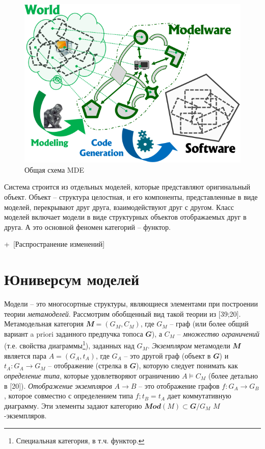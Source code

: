 \documentclass[11pt,draft]{ltxdoc}
\newcommand{\aaa}[2][acolor]{\noindent\textcolor{eclr}%
{+\ [}\textcolor{#1}{#2}\textcolor{eclr}{]}}
\begin{document}
\begin{figure}[htbp]
  \centering
  \includegraphics[width=0.5\linewidth]{mde-general}
  \caption{Общая схема MDE}
  \label{fig:mde-gen-schema}
\end{figure}

Система строится из отдельных моделей, которые представляют оригинальный объект.
Объект -- структура целостная, и его компоненты, представленные в виде моделей,
перекрывают друг друга, взаимодействуют друг с другом. Класс моделей включает
модели в виде структурных объектов отображаемых друг в друга. А это основной
феномен категорий -- функтор.

\aaa{Распространение изменений}

\section{Юниверсум моделей}
\label{sec:mmodcat}

Модели -- это многосортные структуры, являющиеся элементами при построении теории
\emph{метамоделей}.  Рассмотрим обобщенный вид такой теории из [39;20].
Метамодельная категория $\mathbfit{M}=(G_M,C_M)$, где $G_M$ -- граф (или более
общий вариант a priori заданного предпучка топоса $\mathbfit{G}$), а
$C_M$ -- \emph{множество ограничений} (т.е. свойства диаграммы\footnote{Специальная
  категория, в т.ч. функтор.}), заданных над $G_M$.  \emph{Экземпляром} метамодели
$\mathbfit{M}$ является пара $A = (G_A, t_A)$, где $G_A$ -- это другой граф
(объект в $\mathbfit{G}$) и $t_A: G_A \to G_M$ -- отображение (стрелка в
$\mathbfit{G}$), которую следует понимать как \emph{определение типа}, которые
удовлетворяют ограничению $A \models C_M$ (более детально в [20]).
\emph{Отображение экземпляров} $A\to B$ -- это отображение графов $f: G_A\to
G_B$, которое совместно с определением типа $f;t_B = t_A$ дает коммутативную
диаграмму.  Эти элементы задают категорию $\mathbfit{Mod}(M) \subset
\mathbfit{G}/G_M$ $M$-экземпляров.
\end{document}
